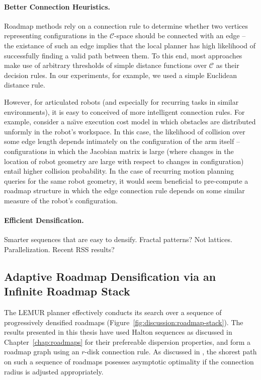 \paragraph{Better Connection Heuristics.}
Roadmap methods rely on a connection rule to determine whether
two vertices representing configurations in the $\mathcal{C}$-space
should be connected with an edge
-- the existance of such an edge implies that the local planner
has high likelihood of successfully finding a valid path between them.
To this end,
most approaches make use of arbitrary thresholds of
simple distance functions over $\mathcal{C}$ as their decision rules.
In our experiments, for example,
we used a simple Euclidean distance rule.

However, for articulated robots
(and especially for recurring tasks in similar environments),
it is easy to conceived of more intelligent connection rules.
For example, consider a na\"{\i}ve execution cost model in which
obstacles are distributed unformly in the robot's workspace.
In this case,
the likelihood of collision over some edge length
depends intimately on the configuration of the arm itself
-- configurations in which the Jacobian matrix is large
(where changes in the location of robot geometry are large
with respect to changes in configuration)
entail higher collision probability.
In the case of recurring motion planning queries for the same
robot geometry,
it would seem beneficial to pre-compute a roadmap structure
in which the edge connection rule depends on some similar measure
of the robot's configuration.

\paragraph{Efficient Densification.}
Smarter sequences that are easy to densify.
Fractal patterns?
Not lattices.
Parallelization.
Recent RSS results?

\subsection{Adaptive Roadmap Densification via an Infinite Roadmap Stack}
\label{sec:discussion:disc}
The LEMUR planner effectively conducts its search over a sequence of
progressively densified roadmaps
(Figure~\ref{fig:discussion:roadmap-stack}).
The results presented in this thesis have used Halton sequences
as discussed in Chapter~\ref{chap:roadmaps}
for their prefereable dispersion properties,
and form a roadmap graph using an $r$-disk connection rule.
As discussed in \citep{janson2015deterministicsampling},
the shorest path on such a sequence of roadmaps
posesses asymptotic optimality if the connection radius is adjusted
appropriately.

